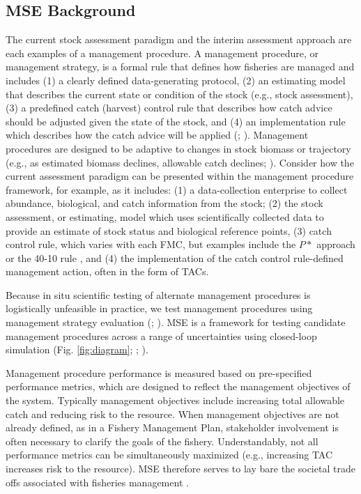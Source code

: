 \documentclass[12pt,english]{article}
\begin{document}
\begin{flushleft}
\begin{spacing}{1.9}
\subsection*{MSE Background}
The current stock assessment paradigm and the interim assessment approach are each examples of a management procedure. A management procedure, or management strategy, is a formal rule that defines how fisheries are managed and includes (1) a clearly defined data-generating protocol, (2) an estimating model that describes the current state or condition of the stock (e.g., stock assessment), (3) a predefined catch (harvest) control rule that describes how catch advice should be adjusted given the state of the stock, and (4) an implementation rule which describes how the catch advice will be applied (\citealt{SainsburyEtAl2000}; \citealt{Punt2010}). Management procedures are designed to be adaptive to changes in stock biomass or trajectory (e.g., as estimated biomass declines, allowable catch declines; \citealt{Edwards2016}). Consider how the current assessment paradigm can be presented within the management procedure framework, for example, as it includes: (1) a data-collection enterprise to collect abundance, biological, and catch information from the stock; (2) the stock assessment, or estimating, model which uses scientifically collected data to provide an estimate of stock status and biological reference points, (3) catch control rule, which varies with each FMC, but examples include the $P*$ approach \citep{ShertzerEtAl2008} or the 40-10 rule \citep{PFMC2020}, and (4) the implementation of the catch control rule-defined management action, often in the form of TACs.

Because in situ scientific testing of alternate management procedures is logistically unfeasible in practice, we test management procedures using management strategy evaluation (\citealt{ButterworthPunt1999}; \citealt{DeOliveiraEtAl2008}). MSE is a framework for testing candidate management procedures across a range of uncertainties using closed-loop simulation (Fig. \ref{fig:diagram}; \citealt{Holland2010}; \citealt{PuntEtAl2016}).

Management procedure performance is measured based on pre-specified performance metrics, which are designed to reflect the management objectives of the system. Typically management objectives include increasing total allowable catch and reducing risk to the resource. When management objectives are not already defined, as in a Fishery Management Plan, stakeholder involvement is often necessary to clarify the goals of the fishery. Understandably, not all performance metrics can be simultaneously maximized (e.g., increasing TAC increases risk to the resource). MSE therefore serves to lay bare the societal trade offs associated with fisheries management \citep{Punt2017}.


\end{spacing}
\end{flushleft}
\end{document}
